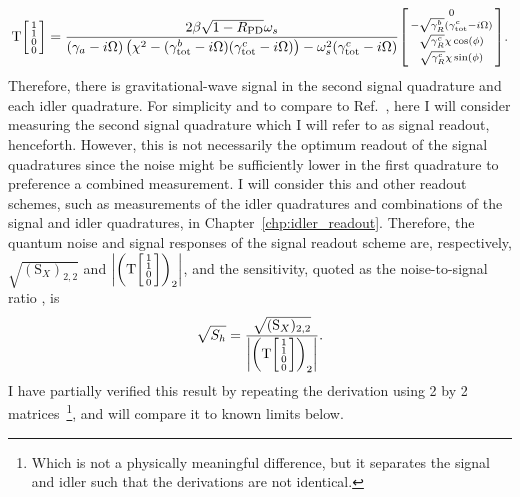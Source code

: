 \begin{equation}\label{eq:nIS_sigRO_signal_response}
\text{T}\begin{bsmallmatrix}1 \\1\\0\\0\end{bsmallmatrix} = \frac{2 \beta \sqrt{1-R_\text{PD}} \omega_s}{(\gamma_a-i \Omega ) \left(\chi ^2-(\gamma^b_\text{tot}-i\Omega) (\gamma^c_\text{tot}-i\Omega)\right)-\omega_s^2 (\gamma^c_\text{tot}-i \Omega )} \begin{bsmallmatrix}0 \\-\sqrt{\gamma^b_R}(\gamma^c_\text{tot}-i\Omega)\\\sqrt{\gamma^c_R}\chi\cos(\phi)\\\sqrt{\gamma^c_R}\chi\sin(\phi)\end{bsmallmatrix}.
\end{equation}
Therefore, there is gravitational-wave signal in the second signal quadrature and each idler quadrature. For simplicity and to compare to Ref.~\cite{Li2020}, here I will consider measuring the second signal quadrature which I will refer to as signal readout, henceforth. However, this is not necessarily the optimum readout of the signal quadratures since the noise might be sufficiently lower in the first quadrature to preference a combined measurement. I will consider this and other readout schemes, such as measurements of the idler quadratures and combinations of the signal and idler quadratures, in Chapter~\ref{chp:idler_readout}.
Therefore, the quantum noise and signal responses of the signal readout scheme are, respectively, $\sqrt{(\text{S}_X)_{2,2}}$ and $\abs{\left(\text{T}\begin{bsmallmatrix}1 \\1\\0\\0\end{bsmallmatrix}\right)_2}$, and the sensitivity, quoted as the noise-to-signal ratio , is
\begin{equation}\label{eq:nIS_sigRO_sens}
\sqrt{S_h} = \frac{\sqrt{(\text{S}_X)_{2,2}}}{\abs{\left(\text{T}\begin{bsmallmatrix}1 \\1\\0\\0\end{bsmallmatrix}\right)_2}}.
\end{equation}
 I have partially verified this result by repeating the derivation using 2 by 2 matrices~\footnote{Which is not a physically meaningful difference, but it separates the signal and idler such that the derivations are not identical.}, and will compare it to known limits below. %


